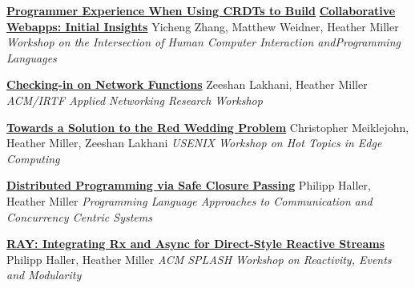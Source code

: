 \documentclass[9pt]{article}
\begin{document}
\noindent\href{https://kilthub.cmu.edu/articles/conference_contribution/Programmer_Experience_When_Using_CRDTs_to_Build_Collaborative_Webapps_Initial_Insights/22277341/1}{\bf Programmer Experience When Using CRDTs to Build}\vspace{-0.03in}
\newline\noindent\href{https://kilthub.cmu.edu/articles/conference_contribution/Programmer_Experience_When_Using_CRDTs_to_Build_Collaborative_Webapps_Initial_Insights/22277341/1}{\bf Collaborative Webapps: Initial Insights}
\newline\noindent Yicheng Zhang, Matthew Weidner, Heather Miller
\newline\noindent\emph{Workshop on the Intersection of Human Computer Interaction and}\vspace{-0.03in}\newline\noindent\emph{Programming Languages}
\bigskip

\noindent\href{https://dl.acm.org/citation.cfm?id=3341131}{\bf Checking-in on Network Functions}
\newline\noindent Zeeshan Lakhani, Heather Miller
\newline\noindent\emph{ACM/IRTF Applied Networking Research Workshop}
\bigskip

\noindent\href{https://www.usenix.org/system/files/conference/hotedge18/hotedge18-papers-meiklejohn.pdf}{\bf Towards a Solution to the Red Wedding Problem}
\newline\noindent Christopher Meiklejohn, Heather Miller, Zeeshan Lakhani
\newline\noindent\emph{USENIX Workshop on Hot Topics in Edge Computing}
\bigskip

\noindent\href{https://infoscience.epfl.ch/record/205039}{\bf Distributed Programming via Safe Closure Passing}
\newline\noindent Philipp Haller, Heather Miller
\newline\noindent\emph{Programming Language Approaches to Communication}
\newline\noindent\emph{and Concurrency Centric Systems}
\bigskip

\noindent\href{http://infoscience.epfl.ch/record/188383}{\bf RAY: Integrating Rx and Async for Direct-Style Reactive Streams}
\newline\noindent Philipp Haller, Heather Miller
\newline\noindent\emph{ACM SPLASH Workshop on Reactivity, Events and Modularity}
\bigskip
\end{document}
